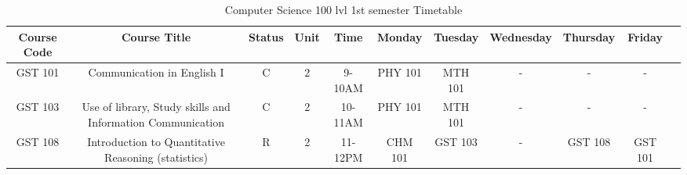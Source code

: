 \documentclass{article}
\begin{document}
	\begin{center}
		\begin{sidewaystable}[h!]
			\caption{Computer Science 100 lvl 1st semester Timetable}
			\label{tab:table1}
			\begin{tabular}{c|c|c|c|c|c|c|c|c|c|c}
					\textbf{Course Code} & \textbf{Course Title} & \textbf{Status} & \textbf{Unit} & \textbf{Time} & \textbf{Monday} & \textbf{Tuesday} & \textbf{Wednesday} & \textbf{Thursday} & \textbf{Friday} \\
					\hline
					\cellcolor{blue!25}GST 101 & \cellcolor{red!15}Communication in English I & C & 2 & 9-10AM & PHY 101 & MTH 101 & - & - & - \\
					\hline
					\cellcolor{green!35}GST 103 & \cellcolor{red!15}Use of library, Study skills and Information Communication & C & 2 & 10-11AM & PHY 101 & MTH 101 & - & - & - \\
					\hline
					\cellcolor{blue!25}GST 108 &  \cellcolor{red!15}Introduction to Quantitative Reasoning (statistics) & R & 2 & 11-12PM & CHM 101 & GST 103 & - & GST 108 & GST 101 \\
					
			\end{tabular}
		\end{sidewaystable}
	\end{center}
\end{document}
